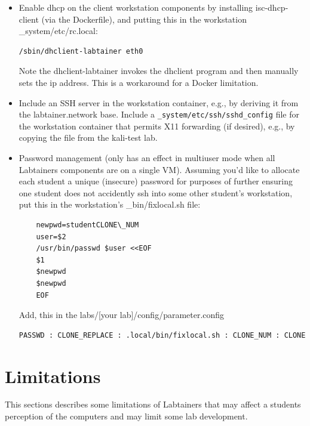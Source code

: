 \documentclass[12pt]{article}
\begin{document}
\begin{itemize}
\item Enable dhcp on the client workstation components by installing isc-dhcp-client
(via the Dockerfile), and putting this in the workstation \_system/etc/rc.local:
\begin{verbatim}
/sbin/dhclient-labtainer eth0
\end{verbatim}
\noindent Note the dhclient-labtainer invokes the dhclient program and then
manually sets the ip address.  This is a workaround for a Docker limitation.

\item Include an SSH server in the workstation container, e.g., by deriving it from the labtainer.network base.
Include a {\tt \_system/etc/ssh/sshd\_config} file for the workstation container that permits X11 forwarding (if desired),
e.g., by copying the file from the kali-test lab.

\item Password management (only has an effect in multiuser mode when all Labtainers components are on a single VM). 
Assuming you'd like to allocate each student a unique (insecure) password for purposes of
further ensuring one student does not accidently ssh into some other student's workstation, put
this in the workstation's \_bin/fixlocal.sh file:
\begin{verbatim}
    newpwd=studentCLONE\_NUM
    user=$2
    /usr/bin/passwd $user <<EOF
    $1
    $newpwd
    $newpwd
    EOF
\end{verbatim}

\noindent Add, this in the labs/[your lab]/config/parameter.config
\begin{verbatim}
PASSWD : CLONE_REPLACE : .local/bin/fixlocal.sh : CLONE_NUM : CLONE
\end{verbatim}

\end{itemize}

\section{Limitations} \label{limitations}
This sections describes some limitations of Labtainers that may affect a
students perception of the computers and may limit some lab development.
\end{document}
